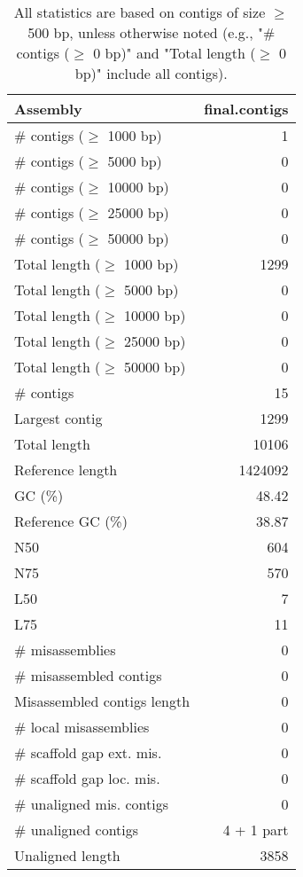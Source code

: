 \documentclass[12pt,a4paper]{article}
\begin{document}
\begin{table}[ht]
\begin{center}
\caption{All statistics are based on contigs of size $\geq$ 500 bp, unless otherwise noted (e.g., "\# contigs ($\geq$ 0 bp)" and "Total length ($\geq$ 0 bp)" include all contigs).}
\begin{tabular}{|l*{1}{|r}|}
\hline
Assembly & final.contigs \\ \hline
\# contigs ($\geq$ 1000 bp) & 1 \\ \hline
\# contigs ($\geq$ 5000 bp) & 0 \\ \hline
\# contigs ($\geq$ 10000 bp) & 0 \\ \hline
\# contigs ($\geq$ 25000 bp) & 0 \\ \hline
\# contigs ($\geq$ 50000 bp) & 0 \\ \hline
Total length ($\geq$ 1000 bp) & 1299 \\ \hline
Total length ($\geq$ 5000 bp) & 0 \\ \hline
Total length ($\geq$ 10000 bp) & 0 \\ \hline
Total length ($\geq$ 25000 bp) & 0 \\ \hline
Total length ($\geq$ 50000 bp) & 0 \\ \hline
\# contigs & 15 \\ \hline
Largest contig & 1299 \\ \hline
Total length & 10106 \\ \hline
Reference length & 1424092 \\ \hline
GC (\%) & 48.42 \\ \hline
Reference GC (\%) & 38.87 \\ \hline
N50 & 604 \\ \hline
N75 & 570 \\ \hline
L50 & 7 \\ \hline
L75 & 11 \\ \hline
\# misassemblies & 0 \\ \hline
\# misassembled contigs & 0 \\ \hline
Misassembled contigs length & 0 \\ \hline
\# local misassemblies & 0 \\ \hline
\# scaffold gap ext. mis. & 0 \\ \hline
\# scaffold gap loc. mis. & 0 \\ \hline
\# unaligned mis. contigs & 0 \\ \hline
\# unaligned contigs & 4 + 1 part \\ \hline
Unaligned length & 3858 \\ \hline

\end{tabular}
\end{center}
\end{table}
\end{document}
